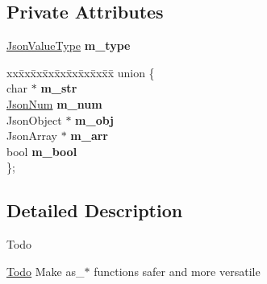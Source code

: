 \subsection*{Private Attributes}
\begin{DoxyCompactItemize}
\item 
\mbox{\label{classnta_1_1utils_1_1Json_ab4a7cc232d1c4ba37f9dcb35f0ac5417}} 
\hyperlink{namespacenta_1_1utils_ac9921c0a3baf86d9facdc4927c66def3}{Json\+Value\+Type} {\bfseries m\+\_\+type}
\item 
\mbox{\label{classnta_1_1utils_1_1Json_a6a4d3082c4d8f9987cb8ce281b87744d}} 
\begin{tabbing}
xx\=xx\=xx\=xx\=xx\=xx\=xx\=xx\=xx\=\kill
union \{\\
\mbox{\label{classnta_1_1utils_1_1Json_ad70123a682fef22afdcf75d20d028e3e}} 
char $\ast$ {\bfseries m\_str}\\
\mbox{\label{classnta_1_1utils_1_1Json_aad4acf20f0eef3112e633df34b799b5a}} 
\hyperlink{classnta_1_1utils_1_1JsonNum}{JsonNum} {\bfseries m\_num}\\
\mbox{\label{classnta_1_1utils_1_1Json_a15a631f10ecc26ba5fba053140bc7500}} 
JsonObject $\ast$ {\bfseries m\_obj}\\
\mbox{\label{classnta_1_1utils_1_1Json_a1ddb791c97e2d345cad4ad63bcb38b6b}} 
JsonArray $\ast$ {\bfseries m\_arr}\\
\mbox{\label{classnta_1_1utils_1_1Json_a4ca79ced26d31b35a7d2f9e0fc8ec347}} 
bool {\bfseries m\_bool}\\
\}; \\

\end{tabbing}\end{DoxyCompactItemize}


\subsection{Detailed Description}
\begin{DoxyRefDesc}{Todo}
\item[\hyperlink{todo__todo000007}{Todo}]Make as\+\_\+$\ast$ functions safer and more versatile\end{DoxyRefDesc}


